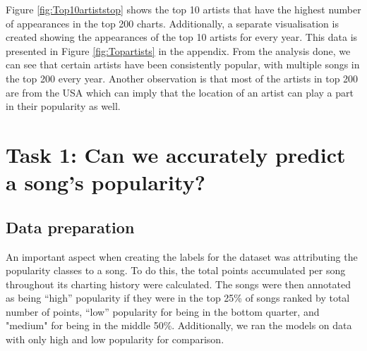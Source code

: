 \documentclass{article}
\begin{document}

Figure \ref {fig:Top10artiststop} shows the top 10 artists that have the highest number of appearances in the top 200 charts. Additionally, a separate visualisation is created showing the appearances of the top 10 artists for every year.
This data is presented in Figure \ref{fig:Topartists} in the appendix. From the analysis done, we can see that certain artists have been consistently popular, with multiple songs in the top 200 every year. Another observation is that most of the artists in top 200 are from the USA which can imply that the location of an artist can play a part in their popularity as well.



\section{Task 1: Can we accurately predict a song's popularity?}

\subsection{Data preparation}
An important aspect when creating the labels for the dataset was attributing the popularity classes to a song. To do this, the total points accumulated per song throughout its charting history were calculated. The songs were then annotated as being “high” popularity if they were in the top 25\% of songs ranked by total number of points, “low” popularity for being in the bottom quarter, and "medium" for being in the middle 50\%. Additionally, we ran the models on data with only high and low popularity for comparison.

\end{document}
